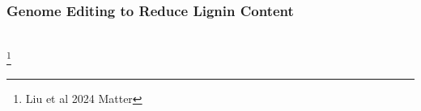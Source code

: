 \documentclass[xcolor=dvipsnames]{beamer}
\newcommand\blfootnote[1]{%
	\begingroup
	\renewcommand\thefootnote{}\footnote{#1}%
	\addtocounter{footnote}{-1}%
	\endgroup
}
\begin{document}
\begin{frame}
	\frametitle{Genome Editing to Reduce Lignin Content}
	
						\\
						\blfootnote{Liu et al 2024 Matter}
\end{frame}
\end{document}
